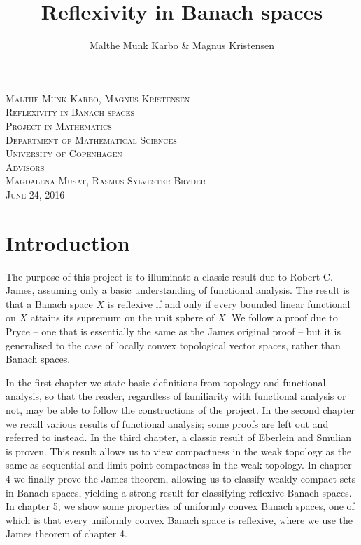 \documentclass[10pt,twoside,openany,final]{memoir}
\title{Reflexivity in Banach spaces}
\author{Malthe Munk Karbo & Magnus Kristensen}
\theoremstyle{break}
\theoremstyle{Break}
\begin{document}
\begin{titlingpage}
	\vspace*{5.5cm}
	\noindent
	{\large\textsc{Malthe Munk Karbo, Magnus Kristensen}}\\[0.5cm]
	{\Large\textsc{Reflexivity in Banach spaces}}\\[0.5cm]
	\vfill\noindent
	{\large\textsc{Project in Mathematics}}\\[0.2cm]
	\noindent
	{\large\textsc{Department of Mathematical Sciences}}\\[0.2cm]
	\noindent
	{\large\textsc{University of Copenhagen}}\\[1cm]
	{\large\textsc{Advisors \\[0.2cm] {\Large Magdalena Musat, Rasmus Sylvester Bryder }}}\\[1cm]
	{\large\textsc{June 24, 2016}}
	\let\cleardoublepage\clearpage
\end{titlingpage}
\setcounter{page}{0}
\tableofcontents*
{}

\chapter*{Introduction}
The purpose of this project is to illuminate a classic result due to Robert C. James, assuming only a basic understanding of functional analysis. The result is that a Banach space $X$ is reflexive if and only if every bounded linear functional on $X$ attains its supremum on the unit sphere of $X$.
We follow a proof due to Pryce -- one that is essentially the same as the James original proof -- but it is generalised to the case of locally convex topological vector spaces, rather than Banach spaces.

In the first chapter we state basic definitions from topology and functional analysis, so that the reader, regardless of familiarity with functional analysis or not, may be able to follow the constructions of the project. In the second chapter we recall various results of functional analysis; some proofs are left out and referred to instead. In the third chapter, a classic result of Eberlein and Smulian is proven. This result allows us to view compactness in the weak topology as the same as sequential and limit point compactness in the weak topology. In chapter 4 we finally prove the James theorem, allowing us to classify weakly compact sets in Banach spaces, yielding a strong result for classifying reflexive Banach spaces. In chapter 5, we show some properties of uniformly convex Banach spaces, one of which is that every uniformly convex Banach space is reflexive, where we use the James theorem of chapter 4.
\end{document}
